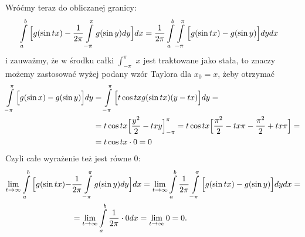 \documentclass{article}[13pt]
\begin{document}
Wróćmy teraz do obliczanej granicy:
\begin{align*}
    \int\limits_a^b\Big[g(\sin tx)&-{1\over2\pi}\int\limits_{-\pi}^\pi g(\sin y)dy\Big]dx={1\over2\pi}\int\limits_a^b\int\limits_{-\pi}^\pi\Big[g(\sin tx)-g(\sin y)\Big]dydx
\end{align*}
i zauważmy, że w środku całki $\int_{-\pi}^\pi$ $x$ jest traktowane jako stała, to znaczy możemy zastosować wyżej podany wzór Taylora dla $x_0=x$, żeby otrzymać
\begin{align*}
    \int\limits_{-\pi}^\pi\Big[g(\sin x)-g(\sin y)\Big]dy&=\int\limits_{-\pi}^\pi \Big[t\cos tx g(\sin tx)(y-tx)\Big]dy=\\
    &=t\cos tx\Big[{y^2\over 2}-txy\Big]_{-\pi}^\pi=t\cos tx\Big[{\pi^2\over 2}-tx\pi-{\pi^2\over 2}+tx\pi\Big]=\\
    &=t\cos tx\cdot 0=0
\end{align*}
Czyli całe wyrażenie też jest równe 0:
\begin{align*}
    \lim\limits_{t\to\infty}\int\limits_a^b\Big[g(\sin tx)-&{1\over2\pi}\int\limits_{-\pi}^{\pi}g(\sin y)dy\Big]dx=\lim\limits_{t\to\infty}\int\limits_a^b{1\over 2\pi}\int\limits_{-\pi}^\pi\Big[g(\sin tx)-g(\sin y)\Big]dydx=\\
    &=\lim\limits_{t\to\infty}\int\limits_a^b{1\over 2\pi}\cdot 0dx=\lim\limits_{t\to\infty}0=0.
\end{align*}

\medskip
\end{document}

